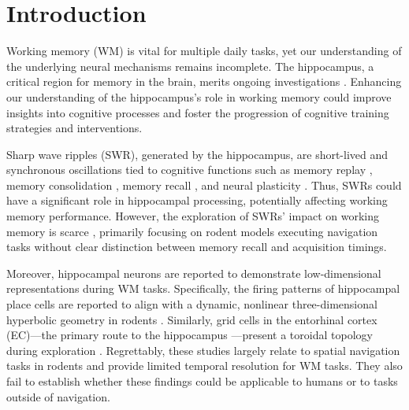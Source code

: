 \section{Introduction}
Working memory (WM) is vital for multiple daily tasks, yet our understanding of the underlying neural mechanisms remains incomplete. The hippocampus, a critical region for memory in the brain, merits ongoing investigations \cite{scoville_loss_1957,squire_legacy_2009,boran_persistent_2019,kaminski_persistently_2017,kornblith_persistent_2017,faraut_dataset_2018,borders_hippocampus_2022,li_functional_2023,dimakopoulos_information_2022}. Enhancing our understanding of the hippocampus's role in working memory could improve insights into cognitive processes and foster the progression of cognitive training strategies and interventions. 

\indent
Sharp wave ripples (SWR), generated by the hippocampus, are short-lived and synchronous oscillations tied to cognitive functions such as memory replay \cite{wilson_reactivation_1994,nadasdy_replay_1999,lee_memory_2002,davidson_hippocampal_2009}, memory consolidation \cite{girardeau_selective_2009,ego-stengel_disruption_2010,fernandez-ruiz_long-duration_2019,kim_corticalhippocampal_2022}, memory recall \cite{wu_hippocampal_2017,norman_hippocampal_2019,norman_hippocampal_2021}, and neural plasticity \cite{behrens_induction_2005,norimoto_hippocampal_2018}. Thus, SWRs could have a significant role in hippocampal processing, potentially affecting working memory performance. However, the exploration of SWRs' impact on working memory is scarce \cite{jadhav_awake_2012}, primarily focusing on rodent models executing navigation tasks without clear distinction between memory recall and acquisition timings.

\indent
Moreover, hippocampal neurons are reported to demonstrate low-dimensional representations during WM tasks. Specifically, the firing patterns of hippocampal place cells \cite{okeefe_hippocampus_1971,okeefe_place_1976,ekstrom_cellular_2003,kjelstrup_finite_2008,harvey_intracellular_2009,royer_control_2012} are reported to align with a dynamic, nonlinear three-dimensional hyperbolic geometry in rodents \cite{zhang_hippocampal_2022}. Similarly, grid cells in the entorhinal cortex (EC)—the primary route to the hippocampus \cite{naber_reciprocal_2001,van_strien_anatomy_2009,strange_functional_2014}—present a toroidal topology during exploration \cite{gardner_toroidal_2022}. Regrettably, these studies largely relate to spatial navigation tasks in rodents and provide limited temporal resolution for WM tasks. They also fail to establish whether these findings could be applicable to humans or to tasks outside of navigation.

